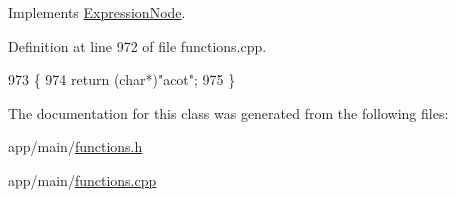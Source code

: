 Implements \hyperlink{classExpressionNode_a42a5e9562b0f645a19dcc83f698069b5}{Expression\+Node}.



Definition at line 972 of file functions.\+cpp.


\begin{DoxyCode}
973 \{
974     \textcolor{keywordflow}{return} (\textcolor{keywordtype}{char}*)\textcolor{stringliteral}{"acot"};
975 \}
\end{DoxyCode}


The documentation for this class was generated from the following files\+:\begin{DoxyCompactItemize}
\item 
app/main/\hyperlink{functions_8h}{functions.\+h}\item 
app/main/\hyperlink{functions_8cpp}{functions.\+cpp}\end{DoxyCompactItemize}
